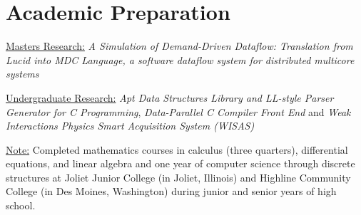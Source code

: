 \section{Academic Preparation}



{\vspace{3pt}\underline{Masters Research:} \textit{A Simulation of Demand-Driven Dataflow: Translation from Lucid into MDC Language, a software dataflow system for distributed multicore systems}}{\vspace{3pt}}

{\vspace{3pt}\underline{Undergraduate Research:} \textit{Apt Data Structures Library and LL-style Parser Generator for C Programming}, \textit{Data-Parallel C Compiler Front End} and \textit{Weak Interactions Physics Smart Acquisition System (WISAS)}}{\vspace{3pt}}

{\vspace{3pt}\underline{Note:} Completed mathematics courses in calculus (three quarters), differential equations, and linear algebra and one year of computer science through discrete structures at Joliet Junior College (in Joliet, Illinois) and Highline Community College (in Des Moines, Washington) during junior and senior years of high school.}{\vspace{3pt}}


